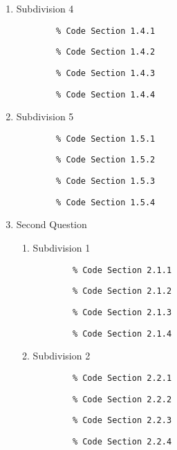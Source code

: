 \documentclass{article}
\begin{document}
\begin{enumerate}
\begin{enumerate}[label*=\arabic*.]
        \item Subdivision 4
        \begin{verbatim}
        % Code Section 1.4.1
        \end{verbatim}
        \begin{verbatim}
        % Code Section 1.4.2
        \end{verbatim}
        \begin{verbatim}
        % Code Section 1.4.3
        \end{verbatim}
        \begin{verbatim}
        % Code Section 1.4.4
        \end{verbatim}

        \item Subdivision 5
        \begin{verbatim}
        % Code Section 1.5.1
        \end{verbatim}
        \begin{verbatim}
        % Code Section 1.5.2
        \end{verbatim}
        \begin{verbatim}
        % Code Section 1.5.3
        \end{verbatim}
        \begin{verbatim}
        % Code Section 1.5.4
        \end{verbatim}
        
    \item Second Question
    \begin{enumerate}[label*=\arabic*.]
        \item Subdivision 1
        \begin{verbatim}
        % Code Section 2.1.1
        \end{verbatim}
        \begin{verbatim}
        % Code Section 2.1.2
        \end{verbatim}
        \begin{verbatim}
        % Code Section 2.1.3
        \end{verbatim}
        \begin{verbatim}
        % Code Section 2.1.4
        \end{verbatim}

        \item Subdivision 2
        \begin{verbatim}
        % Code Section 2.2.1
        \end{verbatim}
        \begin{verbatim}
        % Code Section 2.2.2
        \end{verbatim}
        \begin{verbatim}
        % Code Section 2.2.3
        \end{verbatim}
        \begin{verbatim}
        % Code Section 2.2.4
        \end{verbatim}
        

\end{enumerate}
\end{enumerate}
\end{enumerate}
\end{document}

